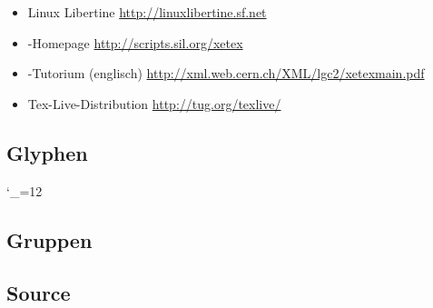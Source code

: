 \documentclass{fontdoku}
\begin{document}
\begin{itemize}
   \item Linux Libertine \hfill\url{http://linuxlibertine.sf.net}
   \item \XeTeX-Homepage \hfill\url{http://scripts.sil.org/xetex}
   \item \XeTeX-Tutorium (englisch) \hfill\url{http://xml.web.cern.ch/XML/lgc2/xetexmain.pdf}
   \item Tex-Live-Distribution \hfill\url{http://tug.org/texlive/}
\end{itemize}

\newpage
\subsection{Glyphen}

\setlength{\columnseprule}{.5pt}
\setlength{\columnsep}{1cm}
\begin{multicols}{3}
   \newcommand{\GYLPHNAME}[1]{\makebox[3cm][l]{#1}\hfill{\Huge\fbox{\libertineGlyph{#1}\strut}}\hfill\mbox{}\newline}
   \catcode`\_=12%
\end{multicols}


\newpage
\subsection{Gruppen}
{\renewcommand{\arraystretch}{1.25}
\newcommand{\GROUPHEAD}[1]{\subsubsection{#1}}
\newcommand{\GROUPFOOT}{}
\newcommand{\GROUPGLYPH}[2]{\mbox{}\libertineGlyph{#2}\strut}
}

\newpage
\subsection{Source}



\newpage
\printindex
\end{document}
